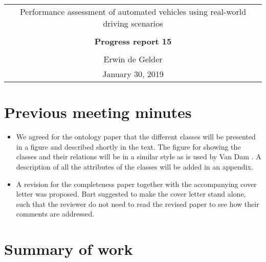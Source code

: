 \documentclass[10pt,final,a4paper,oneside,onecolumn]{article}
\newcommand{\progressreportnumber}{15}
\renewcommand{\author}{Erwin de Gelder}
\renewcommand{\date}{January 30, 2019}
\renewcommand{\title}{Performance assessment of automated vehicles using real-world driving scenarios}
\begin{document}
	
\begin{center}
	\begin{tabular}{c}
		\title \\ \\
		\textbf{\huge Progress report \progressreportnumber} \\ \\
		\author \\ 
		\date
	\end{tabular}
\end{center}

\section{Previous meeting minutes}

\begin{itemize}
	\item We agreed for the ontology paper that the different classes will be presented in a figure and described shortly in the text. The figure for showing the classes and their relations will be in a similar style as is used by Van Dam \cite{vanDamPhDThesis2009}. A description of all the attributes of the classes will be added in an appendix. 
	\item A revision for the completeness paper together with the accompanying cover letter was proposed. Bart suggested to make the cover letter stand alone, such that the reviewer do not need to read the revised paper to see how their comments are addressed.
\end{itemize}

\section{Summary of work}
\end{document}
